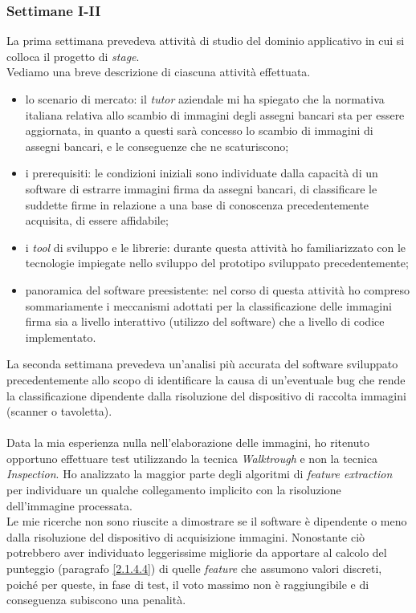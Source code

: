 \subsubsection{Settimane I-II}
\label{3.1.1}
La prima settimana prevedeva attività di studio del dominio applicativo in cui si colloca il progetto di \emph{stage}.\\
Vediamo una breve descrizione di ciascuna attività effettuata.
\begin{itemize}
\item lo scenario di mercato: il \emph{tutor} aziendale mi ha spiegato che la normativa italiana relativa allo scambio di immagini degli assegni bancari sta per essere aggiornata, in quanto a questi sarà concesso lo scambio di immagini di assegni bancari, e le conseguenze che ne scaturiscono;
\item i prerequisiti: le condizioni iniziali sono individuate dalla capacità di un software di estrarre immagini firma da assegni bancari, di classificare le suddette firme in relazione a una base di conoscenza precedentemente acquisita, di essere affidabile;
\item i \emph{tool} di sviluppo e le librerie: durante questa attività ho familiarizzato con le tecnologie impiegate nello sviluppo del prototipo sviluppato precedentemente;
\item panoramica del software preesistente: nel corso di questa attività ho compreso sommariamente i meccanismi adottati per la classificazione delle immagini firma sia a livello interattivo (utilizzo del software) che a livello di codice implementato.
\end{itemize}
La seconda settimana prevedeva un'analisi più accurata del software sviluppato precedentemente allo scopo di identificare la causa di un'eventuale bug che rende la classificazione dipendente dalla risoluzione del dispositivo di raccolta immagini (scanner o tavoletta).\\\\
Data la mia esperienza nulla nell'elaborazione delle immagini, ho ritenuto opportuno effettuare test utilizzando la tecnica \emph{Walktrough} e non la tecnica \emph{Inspection}. Ho analizzato la maggior parte degli algoritmi di \emph{feature extraction} per individuare un qualche collegamento implicito con la risoluzione dell'immagine processata.\\Le mie ricerche non sono riuscite a dimostrare se il software è dipendente o meno dalla risoluzione del dispositivo di acquisizione immagini. Nonostante ciò potrebbero aver individuato leggerissime migliorie da apportare al calcolo del punteggio (paragrafo \ref{2.1.4.4}) di quelle \emph{feature} che assumono valori discreti, poiché per queste, in fase di test, il voto massimo non è raggiungibile e di conseguenza subiscono una penalità.\\\\
